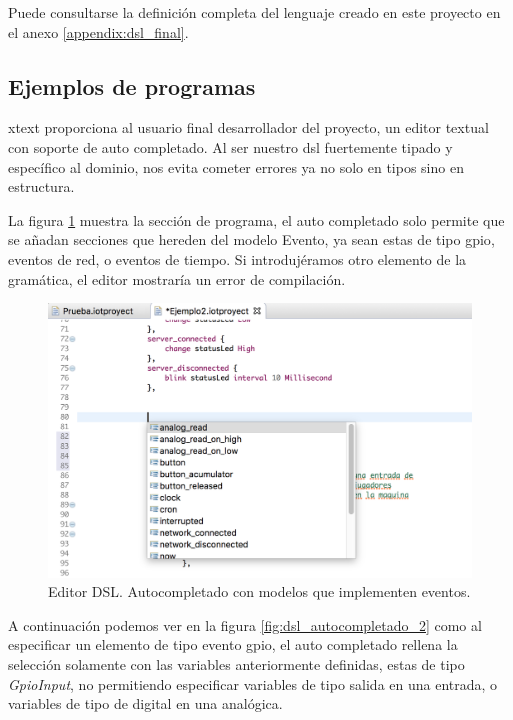 Puede consultarse la definición completa del lenguaje creado en este proyecto en el anexo \ref{appendix:dsl_final}.


\subsection{Ejemplos de programas}

\gls{xtext} proporciona al usuario final desarrollador del proyecto, un editor textual con soporte de auto completado. Al ser nuestro \gls{dsl} fuertemente tipado y específico al dominio, nos evita cometer errores ya no solo en tipos sino en estructura.

La figura \ref{fig:dsl_autocompletado_1} muestra la sección de programa, el auto completado solo permite que se añadan secciones que hereden del modelo Evento, ya sean estas de tipo \gls{gpio}, eventos de red, o eventos de tiempo. Si introdujéramos otro elemento de la gramática, el editor mostraría un error de compilación.

\begin{figure}
	\centering
    \includegraphics[scale=0.4]{images/emf_capturas/autocompletado_dsl_1.png}
    \sourcepropia{}
    \caption{Editor DSL. Autocompletado con modelos que implementen eventos.}
    \label{fig:dsl_autocompletado_1}
\end{figure}

A continuación podemos ver en la figura \ref{fig:dsl_autocompletado_2} como al especificar un elemento de tipo evento \gls{gpio}, el auto completado rellena la selección solamente con las variables anteriormente definidas, estas de tipo \textit{GpioInput}, no permitiendo especificar variables de tipo salida en una entrada, o variables de tipo de digital en una analógica.

